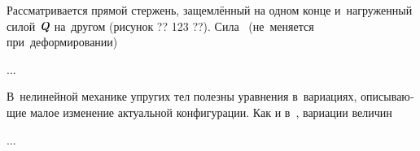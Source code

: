 

\begin{otherlanguage}{russian}

Рассматривается прямой стержень, защемлённый на одном конце и~нагруженный силой~$\mathboldQ$ на~другом (рисунок ?? 123 ??).
Сила ~(не~меняется при~деформировании)

...



\end{otherlanguage}



\begin{otherlanguage}{russian}

В~нелинейной механике упругих тел полезны уравнения в~вариациях, описывающие малое изменение актуальной конфигурации. Как и в~, вариации величин

...



\end{otherlanguage}



